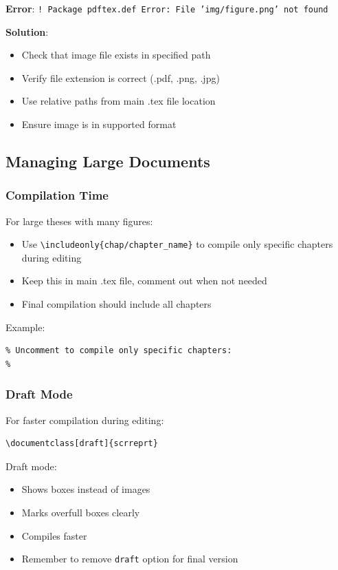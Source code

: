 \textbf{Error}: \texttt{! Package pdftex.def Error: File 'img/figure.png' not found}

\textbf{Solution}:
\begin{itemize}
    \item Check that image file exists in specified path
    \item Verify file extension is correct (.pdf, .png, .jpg)
    \item Use relative paths from main .tex file location
    \item Ensure image is in supported format
\end{itemize}

\subsection*{Managing Large Documents}

\subsubsection*{Compilation Time}

For large theses with many figures:

\begin{itemize}
    \item Use \texttt{\textbackslash includeonly\{chap/chapter\_name\}} to compile only specific chapters during editing
    \item Keep this in main .tex file, comment out when not needed
    \item Final compilation should include all chapters
\end{itemize}

Example:
\begin{verbatim}
% Uncomment to compile only specific chapters:
% 
\end{verbatim}

\subsubsection*{Draft Mode}

For faster compilation during editing:

\begin{verbatim}
\documentclass[draft]{scrreprt}
\end{verbatim}

Draft mode:
\begin{itemize}
    \item Shows boxes instead of images
    \item Marks overfull boxes clearly
    \item Compiles faster
    \item Remember to remove \texttt{draft} option for final version
\end{itemize}

